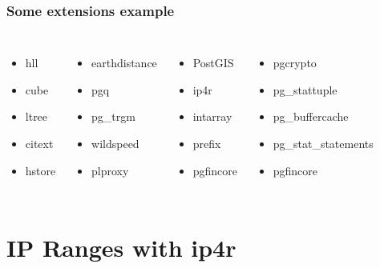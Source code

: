 \documentclass{beamer}
\begin{document}
\begin{frame}[fragile]
  \frametitle{Some extensions example}

  \vfill

\begin{columns}[c]

  \begin{itemize}
   \item \alert{hll}
   \item cube
   \item \alert{ltree}
   \item citext
   \item \alert{hstore}
  \end{itemize}

  \begin{itemize}
   \item \alert{earthdistance}
   \item pgq
   \item \alert{pg\_trgm}
   \item wildspeed
   \item \alert{plproxy}
  \end{itemize}

  \begin{itemize}
   \item PostGIS
   \item \alert{ip4r}
   \item \alert{intarray}
   \item \alert{prefix}
   \item pgfincore
  \end{itemize}

  \begin{itemize}
   \item pgcrypto
   \item pg\_stattuple
   \item pg\_buffercache
   \item pg\_stat\_statements
   \item \alert{pgfincore}
  \end{itemize}

\end{columns}
\end{frame}

\section{IP Ranges with ip4r}
\end{document}
